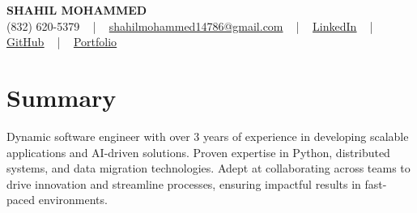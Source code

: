 \documentclass[letterpaper,10pt]{article}
\begin{document}
\begin{center}
    {\fontsize{14pt}{12pt}\selectfont \textbf{\MakeUppercase{Shahil Mohammed}}}\\ \vspace{2pt}
    \fontsize{10pt}{12pt}\selectfont (832) 620-5379 ~ | ~ \href{mailto:shahilmohammed14786@gmail.com}{shahilmohammed14786@gmail.com} ~ | ~  
    \href{https://www.linkedin.com/in/shahil-mohammed-9652931a1/}{\color{blue}\underline{LinkedIn}}  ~ | ~ 
    \href{https://github.com/freakbeast14}{\color{blue}\underline{GitHub}} ~ | ~ 
    \href{https://shahil-mohammed.netlify.app/}{\color{blue}\underline{Portfolio}}
    \vspace{-8pt}
\end{center}

\section{Summary}
\vspace{-2pt}\fontsize{8pt}{9pt}\selectfont
Dynamic software engineer with over 3 years of experience in developing scalable applications and AI-driven solutions. Proven expertise in Python, distributed systems, and data migration technologies. Adept at collaborating across teams to drive innovation and streamline processes, ensuring impactful results in fast-paced environments.
 \vspace{-5pt}
 
\vspace{-2pt}
\end{document}
